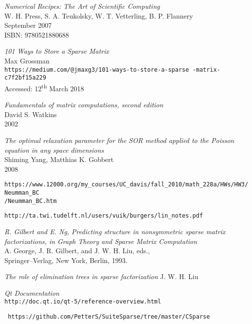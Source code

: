 \documentclass[a4paper]{article}
\begin{document}
\pagebreak

\begin{thebibliography}{15}

		\emph{Numerical Recipes: The Art of Scientific Computing}\\
		W. H. Press, S. A. Teukolsky, W. T. Vetterling, B. P. Flannery\\
		September 2007\\
		ISBN: 9780521880688

		\emph{101 Ways to Store a Sparse Matrix}\\
		Max Grossman\\
		\texttt{https://medium.com/@jmaxg3/101-ways-to-store-a-sparse
		-matrix-c7f2bf15a229}\\
		Accessed: 12\textsuperscript{th} March 2018
        
		\emph{Fundamentals of matrix computations,  second edition}\\
		David S. Watkins\\
		2002

		\emph{The optimal relaxation parameter for the SOR method
		applied to the Poisson equation in any space dimensions}\\
		Shiming Yang, Matthias K. Gobbert\\
		2008

	\texttt{https://www.12000.org/my\_courses/UC\_davis/fall\_2010/math\_228a/HWs/HW3/Neumman\_BC\\
	/Neumman\_BC.htm}
            
  		\verb!http://ta.twi.tudelft.nl/users/vuik/burgers/lin_notes.pdf!
  
		\emph{R. Gilbert and E. Ng, Predicting structure in 
		nonsymmetric sparse matrix factorizations,
		in Graph Theory and Sparse Matrix Computation}\\
		A. George, J. R. Gilbert, and J. W. H. Liu, eds.,\\
		Springer–Verlag, New York, Berlin, 1993.
    
		\emph{The role of elimination trees in sparse factorization}
		J. W. H. Liu

		\emph{Qt Documentation}\\
		\texttt{http://doc.qt.io/qt-5/reference-overview.html}

		\texttt{
		https://github.com/PetterS/SuiteSparse/tree/master/CSparse 
		}
\end{thebibliography}
\end{document}
